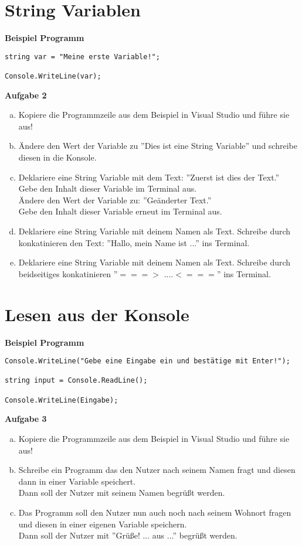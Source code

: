 \documentclass[a4paper,12pt]{article}
\newcommand{\Aufgabe}[1]{
  {
  \vspace*{0.5cm}
  \textsf{\textbf{Aufgabe #1}}
  \vspace*{0.2cm}
  
  }
}
\newcommand{\Definition}[1]{
  {
  \vspace*{0.5cm}
  \textsf{\textbf{#1}}
  \vspace*{0.2cm}
  
  }
}
\begin{document}
\section{String Variablen}
\Definition{Beispiel Programm}

\begin{verbatim}
string var = "Meine erste Variable!";

Console.WriteLine(var);
\end{verbatim}

\Aufgabe{2} 
\begin{enumerate}[a)]
\item
Kopiere die Programmzeile aus dem Beispiel in Visual Studio und führe sie aus!
\item 
Ändere den Wert der Variable zu ''Dies ist eine String Variable'' und schreibe diesen in die Konsole.
\item
Deklariere eine String Variable mit dem Text: ''Zuerst ist dies der Text.''\\
Gebe den Inhalt dieser Variable im Terminal aus. \\
Ändere den Wert der Variable zu: ''Geänderter Text.'' \\
Gebe den Inhalt dieser Variable erneut im Terminal aus.
\item 
Deklariere eine String Variable mit deinem Namen als Text.
Schreibe durch konkatinieren den Text: 
''Hallo, mein Name ist ...'' ins Terminal.
\item
Deklariere eine String Variable mit deinem Namen als Text.
Schreibe durch beidseitiges konkatinieren ''$===>$ ....$<===$'' ins Terminal.
\end{enumerate}

\section{Lesen aus der Konsole}
\Definition{Beispiel Programm}

\begin{verbatim}
Console.WriteLine("Gebe eine Eingabe ein und bestätige mit Enter!");

string input = Console.ReadLine();

Console.WriteLine(Eingabe);
\end{verbatim}

\Aufgabe{3} 
\begin{enumerate}[a)]
\item
Kopiere die Programmzeile aus dem Beispiel in Visual Studio und führe sie aus!
\item 
Schreibe ein Programm das den Nutzer nach seinem Namen fragt und diesen dann in einer Variable speichert. \\ Dann soll der Nutzer mit seinem Namen begrüßt werden.
\item
Das Programm soll den Nutzer nun auch noch nach seinem Wohnort fragen und diesen in einer eigenen Variable speichern. \\ Dann soll der Nutzer mit ''Grüße! ... aus ...'' begrüßt werden.
\end{enumerate}
\end{document}
